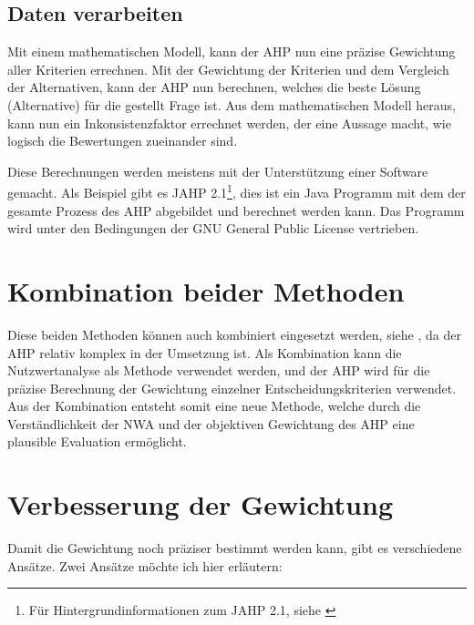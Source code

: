   \subsection{Daten verarbeiten}
  
  Mit einem mathematischen Modell, kann der \ac{AHP} nun eine präzise Gewichtung
  aller Kriterien errechnen. Mit der Gewichtung der Kriterien und dem Vergleich
  der Alternativen, kann der \ac{AHP} nun berechnen, welches die beste Lösung
  (Alternative) für die gestellt Frage ist. Aus dem mathematischen Modell
  heraus, kann nun ein Inkonsistenzfaktor errechnet werden, der eine Aussage
  macht, wie logisch die Bewertungen zueinander sind.
  
  Diese Berechnungen werden meistens mit der Unterstützung einer Software
  gemacht. Als Beispiel gibt es JAHP 2.1\footnote{Für Hintergrundinformationen
  zum JAHP 2.1, siehe \cite{JAHP}}, dies ist ein Java Programm mit dem der
  gesamte Prozess des \ac{AHP} abgebildet und berechnet werden kann. Das
  Programm wird unter den Bedingungen der GNU General Public License
  vertrieben.
    
  \section{Kombination beider Methoden}
  
  Diese beiden Methoden können auch kombiniert eingesetzt werden, siehe
  \cite{AhpNwaKombination}, da der \ac{AHP} relativ komplex in der Umsetzung
  ist. Als Kombination kann die Nutzwertanalyse als Methode verwendet werden,
  und der \ac{AHP} wird für die präzise Berechnung der Gewichtung einzelner
  Entscheidungskriterien verwendet. Aus der Kombination entsteht somit eine
  neue Methode, welche durch die Verständlichkeit der \ac{NWA} und der
  objektiven Gewichtung des \ac{AHP} eine plausible Evaluation ermöglicht.
  
  \section{Verbesserung der 
  Gewichtung}\label{subsection:VerbesserungDerGewichtung}
  
  Damit die Gewichtung noch präziser bestimmt werden kann, gibt es verschiedene
  Ansätze. Zwei Ansätze möchte ich hier erläutern:
  
